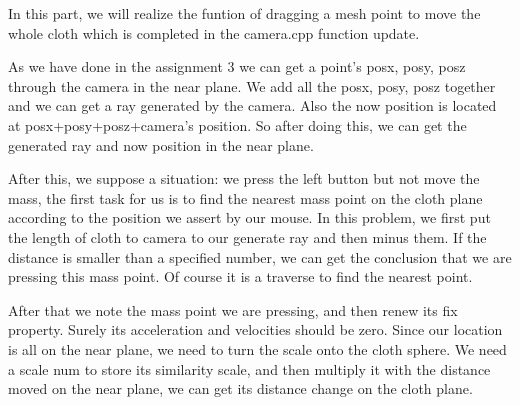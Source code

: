 \documentclass[acmtog]{acmart}
\begin{document}
In this part, we will realize the funtion of dragging a mesh point to move the whole cloth which is completed in the camera.cpp function update.

As we have done in the assignment 3 we can get a point's posx, posy, posz through the camera in the near plane. We add all the posx, posy, posz together and we can get a ray generated by the camera. Also the now position is located at posx+posy+posz+camera's position. So after doing this, we can get the generated ray and now position in the near plane.

After this, we suppose a situation: we press the left button but not move the mass, the first task for us is to find the nearest mass point on the cloth plane according to the position we assert by our mouse. In this problem, we first put the length of cloth to camera to our generate ray and then minus them. If the distance is smaller than a specified number, we can get the conclusion that we are pressing this mass point. Of course it is a traverse to find the nearest point.

After that we note the mass point we are pressing, and then renew its fix property. Surely its acceleration and velocities should be zero. Since our location is all on the near plane, we need to turn the scale onto the cloth sphere. We need a scale num to store its similarity scale, and then multiply it with the distance moved on the near plane, we can get its distance change on the cloth plane.
\end{document}
